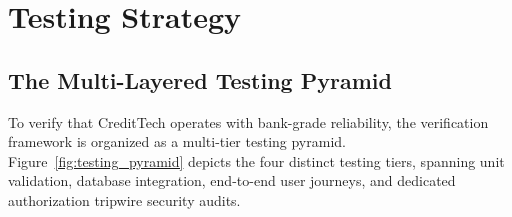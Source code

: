 \chapter{Testing Strategy}
\label{chap:testing_strategy}

\section{The Multi-Layered Testing Pyramid}
To verify that CreditTech operates with bank-grade reliability, the verification framework is organized as a multi-tier testing pyramid. Figure~\ref{fig:testing_pyramid} depicts the four distinct testing tiers, spanning unit validation, database integration, end-to-end user journeys, and dedicated authorization tripwire security audits.

